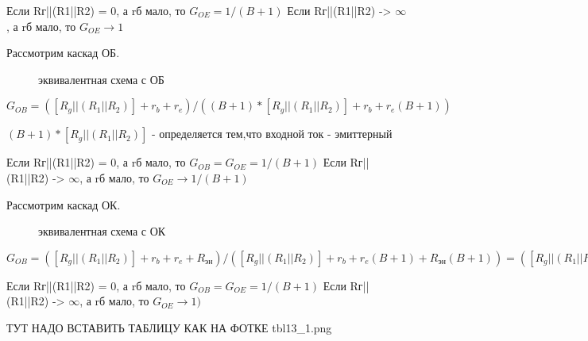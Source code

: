 Если Rг||(R1||R2) = 0, а rб мало, то $G_\textit{OE} =1/(B+1)$
Если Rг||(R1||R2) -> $\infty$, а rб мало, то $G_\textit{OE} \longrightarrow 1$


Рассмотрим каскад ОБ.

\begin{center}
        \begin{figure}[h!]
                \caption{эквивалентная схема с ОБ}
                \label{EOB}
        \end{figure}
\end{center}

$G_\textit{OB} = ([R_g ||(R_1||R_2)] + r_b+r_e)/((B+1)*[R_g ||(R_1||R_2)] + r_b+r_e(B+1))$

$(B+1)*[R_g ||(R_1||R_2)]$ - определяется тем,что входной ток - эмиттерный

Если Rг||(R1||R2) = 0, а rб мало, то $G_\textit{OB}=G_\textit{OE} =1/(B+1)$
Если Rг||(R1||R2) -> $\infty$, а rб мало, то $G_\textit{OE} \longrightarrow 1/(B+1)$

Рассмотрим каскад ОК.

\begin{center}
        \begin{figure}[h!]
                \caption{эквивалентная схема с ОК}
                \label{OK1}
        \end{figure}
\end{center}

$G_\textit{OB} = ([R_g ||(R_1||R_2)] + r_b+r_e+R_\textit{эн})/([R_g ||(R_1||R_2)] + r_b+r_e(B+1) + R_\textit{эн}(B+1)) = ([R_g ||(R_1||R_2)] + r_b+r_e+R_\textit{эн})/([R_g ||(R_1||R_2)] + (r_b+r_e+R_\textit{эн})*(B+1))$

Если Rг||(R1||R2) = 0, а rб мало, то $G_\textit{OB}=G_\textit{OE} =1/(B+1)$
Если Rг||(R1||R2) -> $\infty$, а rб мало, то $G_\textit{OE} \longrightarrow 1)$

ТУТ НАДО ВСТАВИТЬ ТАБЛИЦУ КАК НА ФОТКЕ tbl13_1.png

